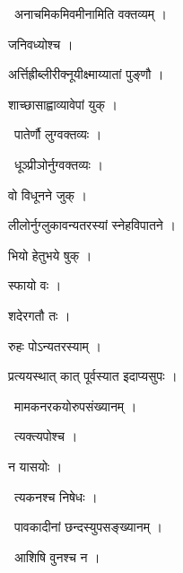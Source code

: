 \documentclass[10pt, openany, oneside]{book}
\begin{document}
\par\noindent\hspace{1.5em}{\vps वा॰}~{\qt अनाचमिकमिवमीनामिति वक्तव्यम् ।}

\noindent जनिवध्योश्च ।

\noindent अर्त्तिह्रीब्लीरीक्नूयीक्ष्माय्यातां पुङ्णौ ।

\noindent शाच्छासाह्वाव्यावेपां युक् ।

\par\noindent\hspace{1.5em}{\vps वा॰}~{\qt पातेर्णौ लुग्वक्तव्यः ।}

\par\noindent\hspace{1.5em}{\vps वा॰}~{\qt धूञ्प्रीञोर्नुग्वक्तव्यः ।}

\noindent वो विधूनने जुक् ।

\noindent लीलोर्नुग्लुकावन्यतरस्यां स्नेहविपातने ।

\noindent भियो हेतुभये षुक् ।

\noindent स्फायो वः ।

\noindent शदेरगतौ तः ।

\noindent रुहः पोऽन्यतरस्याम् ।

\noindent प्रत्ययस्थात् कात् पूर्वस्यात इदाप्यसुपः ।

\par\noindent\hspace{1.5em}{\vps वा॰}~{\qt मामकनरकयोरुपसंख्यानम् ।}

\par\noindent\hspace{1.5em}{\vps वा॰}~{\qt त्यक्त्यपोश्च ।}

\noindent न यासयोः ।

\par\noindent\hspace{1.5em}{\vps वा॰}~{\qt त्यकनश्च निषेधः ।}

\par\noindent\hspace{1.5em}{\vps वा॰}~{\qt पावकादीनां छन्दस्युपसङ्ख्यानम् ।}

\par\noindent\hspace{1.5em}{\vps वा॰}~{\qt आशिषि वुनश्च न ।}
\end{document}
